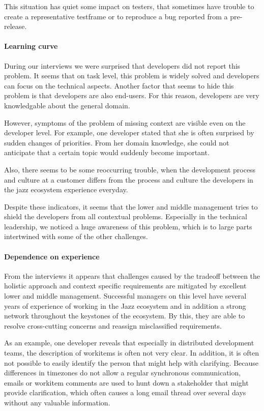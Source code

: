 This situation has quiet some impact on testers, that sometimes have trouble to create a representative testframe or to reproduce a bug reported from a pre-release.

\paragraph{Learning curve}
During our interviews we were surprised that developers did not report this problem. 
It seems that on task level, this problem is widely solved and developers can focus on the technical aspects.
Another factor that seems to hide this problem is that developers are also end-users.
For this reason, developers are very knowledgable about the general domain.

However, symptoms of the problem of missing context are visible even on the developer level. 
For example, one developer stated that she is often surprised by sudden changes of priorities.
From her domain knowledge, she could not anticipate that a certain topic would suddenly become important. 

Also, there seems to be some reoccurring trouble, when the development process and culture at a customer differs from the process and culture the developers in the jazz ecosystem experience everyday.

Despite these indicators, it seems that the lower and middle management tries to shield the developers from all contextual problems. 
Especially in the technical leadership, we noticed a huge awareness of this problem, which is to large parts intertwined with some of the other challenges.

\paragraph{Dependence on experience}
From the interviews it appears that challenges caused by the tradeoff between the holistic approach and context specific requirements are mitigated by excellent lower and middle management. 
Successful managers on this level have several years of experience of working in the Jazz ecosystem and in addition a strong network throughout the keystones of the ecosystem. 
By this, they are able to resolve cross-cutting concerns and reassign misclassified requirements. 

As an example, one developer reveals that especially in distributed development teams, the description of workitems is often not very clear. 
In addition, it is often not possible to easily identify the person that might help with clarifying. 
Because differences in timezones do not allow a regular synchronous communication, emails or workitem comments are used to hunt down a stakeholder that might provide clarification, which often causes a long email thread over several days without any valuable information.

